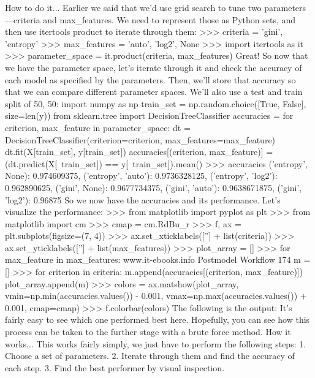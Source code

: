 How to do it...
Earlier we said that we'd use grid search to tune two parameters—criteria and
max_features. We need to represent those as Python sets, and then use itertools
product to iterate through them:
>>> criteria = {'gini', 'entropy'}
>>> max_features = {'auto', 'log2', None}
>>> import itertools as it
>>> parameter_space = it.product(criteria, max_features)
Great! So now that we have the parameter space, let's iterate through it and check the accuracy
of each model as specified by the parameters. Then, we'll store that accuracy so that we can
compare different parameter spaces. We'll also use a test and train split of 50, 50:
import numpy as np
train_set = np.random.choice([True, False], size=len(y))
from sklearn.tree import DecisionTreeClassifier
accuracies = {}
for criterion, max_feature in parameter_space:
dt = DecisionTreeClassifier(criterion=criterion,
max_features=max_feature)
dt.fit(X[train_set], y[train_set])
accuracies[(criterion, max_feature)] = (dt.predict(X[~train_set])
== y[~train_set]).mean()
>>> accuracies
{('entropy', None): 0.974609375, ('entropy', 'auto'): 0.9736328125,
('entropy', 'log2'): 0.962890625, ('gini', None): 0.9677734375, ('gini',
'auto'): 0.9638671875, ('gini', 'log2'): 0.96875}
So we now have the accuracies and its performance. Let's visualize the performance:
>>> from matplotlib import pyplot as plt
>>> from matplotlib import cm
>>> cmap = cm.RdBu_r
>>> f, ax = plt.subplots(figsize=(7, 4))
>>> ax.set_xticklabels([''] + list(criteria))
>>> ax.set_yticklabels([''] + list(max_features))
>>> plot_array = []
>>> for max_feature in max_features:
www.it-ebooks.info
Postmodel Workflow
174
m = []
>>> for criterion in criteria:
m.append(accuracies[(criterion, max_feature)])
plot_array.append(m)
>>> colors = ax.matshow(plot_array, vmin=np.min(accuracies.values()) -
0.001, vmax=np.max(accuracies.values()) + 0.001, cmap=cmap)
>>> f.colorbar(colors)
The following is the output:
It's fairly easy to see which one performed best here. Hopefully, you can see how this process
can be taken to the further stage with a brute force method.
How it works...
This works fairly simply, we just have to perform the following steps:
1. Choose a set of parameters.
2. Iterate through them and find the accuracy of each step.
3. Find the best performer by visual inspection.

